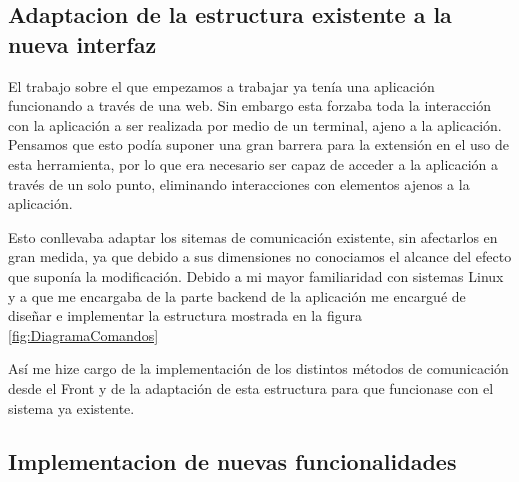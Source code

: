 \subsection*{Adaptacion de la estructura existente a la nueva interfaz}

El trabajo sobre el que empezamos a trabajar ya tenía una aplicación funcionando a través de una web. Sin embargo esta forzaba toda la interacción con la aplicación a ser realizada por medio de un terminal, ajeno a la aplicación. Pensamos que esto podía suponer una gran barrera para la extensión en el uso de esta herramienta, por lo que era necesario ser capaz de acceder a la aplicación a través de un solo punto, eliminando interacciones con elementos ajenos a la aplicación.

Esto conllevaba adaptar los sitemas de comunicación existente, sin afectarlos en gran medida, ya que debido a sus dimensiones no conociamos el alcance del efecto que suponía la modificación. Debido a mi mayor familiaridad con sistemas Linux y a que me encargaba de la parte backend de la aplicación me encargué de diseñar e implementar la estructura mostrada en la figura \ref{fig:DiagramaComandos}

Así me hize cargo de la implementación de los distintos métodos de comunicación desde el Front y de la adaptación de esta estructura para que funcionase con el sistema ya existente.

\subsection*{Implementacion de nuevas funcionalidades}


